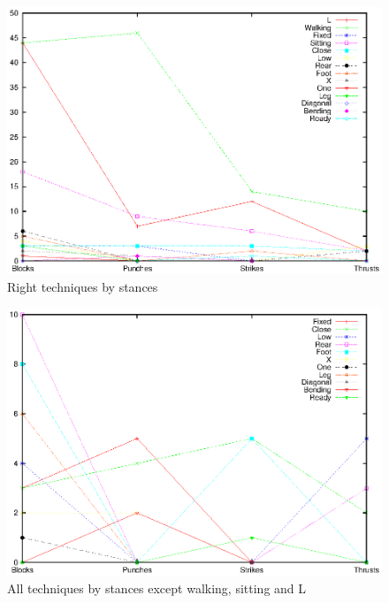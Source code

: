 \documentclass[10pt,twocolumn,a4paper]{article}
\begin{document}
  \begin{figure}
    \includegraphics[scale=0.72]{data/gnuplot/eps/stances_right}
    \caption{Right techniques by stances}
    \label{fig:stances_right}
  \end{figure}

  \begin{figure}
    \includegraphics[scale=0.72]{data/gnuplot/eps/stances_not_wsl}
    \caption{All techniques by stances except walking, sitting and L}
    \label{fig:stances_not_wsl}
  \end{figure}
\end{document}
